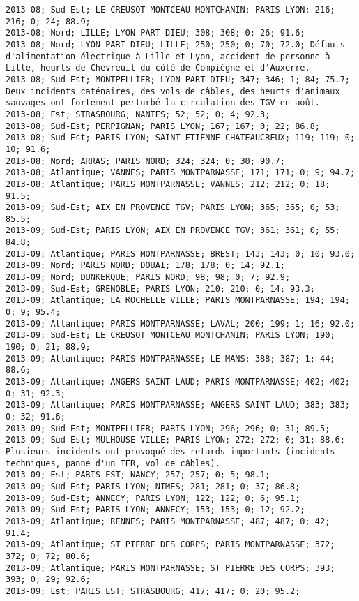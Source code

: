\documentclass{article}
\begin{document}
\begin{Verbatim}[commandchars=\\\{\}]
2013-08; Sud-Est; LE CREUSOT MONTCEAU MONTCHANIN; PARIS LYON; 216; 216; 0; 24; 88.9; 
2013-08; Nord; LILLE; LYON PART DIEU; 308; 308; 0; 26; 91.6; 
2013-08; Nord; LYON PART DIEU; LILLE; 250; 250; 0; 70; 72.0; Défauts d'alimentation électrique à Lille et Lyon, accident de personne à Lille, heurts de Chevreuil du côté de Compiègne et d'Auxerre.
2013-08; Sud-Est; MONTPELLIER; LYON PART DIEU; 347; 346; 1; 84; 75.7; Deux incidents caténaires, des vols de câbles, des heurts d'animaux sauvages ont fortement perturbé la circulation des TGV en août.
2013-08; Est; STRASBOURG; NANTES; 52; 52; 0; 4; 92.3; 
2013-08; Sud-Est; PERPIGNAN; PARIS LYON; 167; 167; 0; 22; 86.8; 
2013-08; Sud-Est; PARIS LYON; SAINT ETIENNE CHATEAUCREUX; 119; 119; 0; 10; 91.6; 
2013-08; Nord; ARRAS; PARIS NORD; 324; 324; 0; 30; 90.7; 
2013-08; Atlantique; VANNES; PARIS MONTPARNASSE; 171; 171; 0; 9; 94.7; 
2013-08; Atlantique; PARIS MONTPARNASSE; VANNES; 212; 212; 0; 18; 91.5; 
2013-09; Sud-Est; AIX EN PROVENCE TGV; PARIS LYON; 365; 365; 0; 53; 85.5; 
2013-09; Sud-Est; PARIS LYON; AIX EN PROVENCE TGV; 361; 361; 0; 55; 84.8; 
2013-09; Atlantique; PARIS MONTPARNASSE; BREST; 143; 143; 0; 10; 93.0; 
2013-09; Nord; PARIS NORD; DOUAI; 178; 178; 0; 14; 92.1; 
2013-09; Nord; DUNKERQUE; PARIS NORD; 98; 98; 0; 7; 92.9; 
2013-09; Sud-Est; GRENOBLE; PARIS LYON; 210; 210; 0; 14; 93.3; 
2013-09; Atlantique; LA ROCHELLE VILLE; PARIS MONTPARNASSE; 194; 194; 0; 9; 95.4; 
2013-09; Atlantique; PARIS MONTPARNASSE; LAVAL; 200; 199; 1; 16; 92.0; 
2013-09; Sud-Est; LE CREUSOT MONTCEAU MONTCHANIN; PARIS LYON; 190; 190; 0; 21; 88.9; 
2013-09; Atlantique; PARIS MONTPARNASSE; LE MANS; 388; 387; 1; 44; 88.6; 
2013-09; Atlantique; ANGERS SAINT LAUD; PARIS MONTPARNASSE; 402; 402; 0; 31; 92.3; 
2013-09; Atlantique; PARIS MONTPARNASSE; ANGERS SAINT LAUD; 383; 383; 0; 32; 91.6; 
2013-09; Sud-Est; MONTPELLIER; PARIS LYON; 296; 296; 0; 31; 89.5; 
2013-09; Sud-Est; MULHOUSE VILLE; PARIS LYON; 272; 272; 0; 31; 88.6; Plusieurs incidents ont provoqué des retards importants (incidents techniques, panne d'un TER, vol de câbles).
2013-09; Est; PARIS EST; NANCY; 257; 257; 0; 5; 98.1; 
2013-09; Sud-Est; PARIS LYON; NIMES; 281; 281; 0; 37; 86.8; 
2013-09; Sud-Est; ANNECY; PARIS LYON; 122; 122; 0; 6; 95.1; 
2013-09; Sud-Est; PARIS LYON; ANNECY; 153; 153; 0; 12; 92.2; 
2013-09; Atlantique; RENNES; PARIS MONTPARNASSE; 487; 487; 0; 42; 91.4; 
2013-09; Atlantique; ST PIERRE DES CORPS; PARIS MONTPARNASSE; 372; 372; 0; 72; 80.6; 
2013-09; Atlantique; PARIS MONTPARNASSE; ST PIERRE DES CORPS; 393; 393; 0; 29; 92.6; 
2013-09; Est; PARIS EST; STRASBOURG; 417; 417; 0; 20; 95.2; 

\end{Verbatim}
\end{document}
